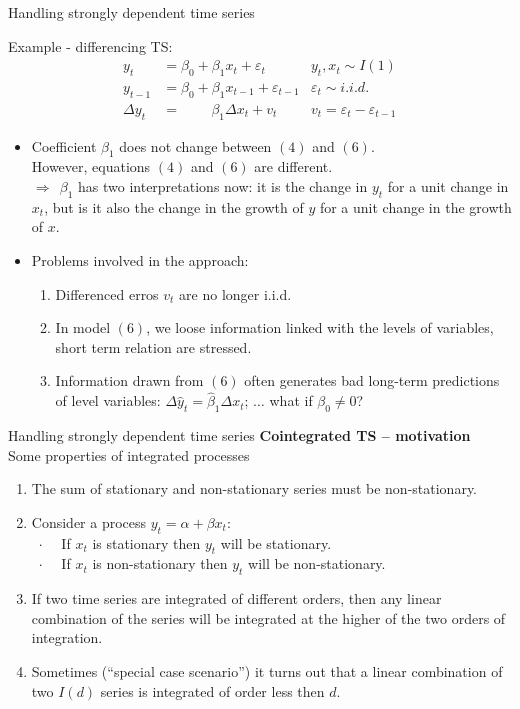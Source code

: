 \documentclass{beamer}
\begin{document}
\begin{frame}{Handling strongly dependent time series}
\vspace{-0.5cm}
\begin{block}{Example - differencing TS: }
\vspace{-0.5cm}
\begin{align} 
y_t & = \beta_0 + \beta_1 x_t + \varepsilon_t & y_t, x_t \sim I(1) \\
y_{t-1} & = \beta_0 + \beta_1 x_{t-1} + \varepsilon_{t-1} & \varepsilon_t \sim i.i.d. \\
\Delta y_t & = \qquad \, \beta_1\Delta x_t + v_t  & v_t= \varepsilon_t - \varepsilon_{t-1}
\end{align}
\end{block}
\begin{itemize}
\item Coefficient $\beta_1$ does not change between $(4)$ and $(6)$.
\\ However, equations $(4)$ and $(6)$ are different.
\\$\Rightarrow~~\beta_1$ has two interpretations now: it is the change in $y_t$ for a unit change in $x_t$, but is it also the change in the growth of $y$ for a unit change in the growth of $x$.
\item Problems involved in the approach: 
\begin{enumerate}
\item Differenced erros $v_t$ are no longer i.i.d.
\item In model $(6)$, we loose information linked with the levels of variables, short term relation are stressed.
\item Information drawn from $(6)$ often generates bad long-term predictions of level variables: 
$ \Delta \hat{y}_t = \hat{\beta}_1 \Delta x_t$; $ \dots $ what if $\beta_0 \neq 0$? 
\end{enumerate}
\end{itemize}
\end{frame}
\begin{frame}{Handling strongly dependent time series}
\textbf{Cointegrated TS -- motivation}\\ \medskip
Some properties of integrated processes
\medskip
\begin{enumerate}
\item The sum of stationary and non-stationary series must be non-stationary.
\medskip
\item Consider a process $y_t=\alpha + \beta x_t$:\\
~$\cdot$~~ If $x_t$ is stationary then $y_t$ will be stationary. \\
~$\cdot$~~ If $x_t$ is non-stationary then $y_t$ will be non-stationary. 
\medskip
\item If two time series are integrated of different orders, then any linear combination of the series will be integrated at the higher of the two orders of integration. 
\medskip
\item Sometimes (``special case scenario'') it turns out that a linear combination of two $I(d)$ series is integrated of order less then $d$. 
\end{enumerate}
\end{frame}
\end{document}
